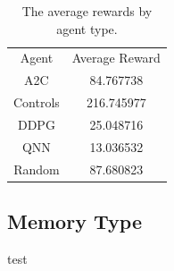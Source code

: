 \begin{table}[!htbp]
    \renewcommand{\arraystretch}{1.3}

    \caption{The average rewards by agent type.}
    \label{tab:agent-average-reward}

    \centering
    \begin{tabular}{|c|c|}
        \hline
        Agent    & Average Reward \\
        \hhline{|=|=|}
        A2C      & 84.767738      \\
        \hline
        Controls & 216.745977     \\
        \hline
        DDPG     & 25.048716      \\
        \hline
        QNN      & 13.036532      \\
        \hline
        Random   & 87.680823      \\
        \hline
    \end{tabular}
\end{table}

\subsection{Memory Type}\label{subsec:memory-type}
test

